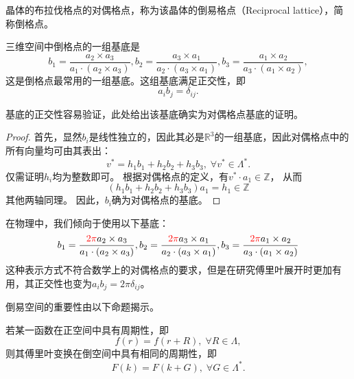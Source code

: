 \begin{definition}
    晶体的布拉伐格点的对偶格点，称为该晶体的倒易格点（Reciprocal lattice），简称倒格点。
\end{definition}

\begin{proposition}
    三维空间中倒格点的一组基底是
    \begin{equation}b_1 = \frac{a_2 \times a_3}{a_1 \cdot (a_2 \times a_3)}, b_2 = \frac{a_3 \times a_1}{a_2 \cdot (a_3 \times a_1)}, b_3 = \frac{a_1 \times a_2}{a_3 \cdot (a_1 \times a_2)},\end{equation}
    这是倒格点最常用的一组基底。这组基底满足正交性，即
    \begin{equation}a_i b_j = \delta_{ij}.\end{equation}
\end{proposition}

基底的正交性容易验证，此处给出该基底确实为对偶格点基底的证明。

\begin{proof}
    首先，显然$b_i$是线性独立的，因此其必是$\mathbb R^3$的一组基底，因此对偶格点中的所有向量均可由其表出：
    \begin{equation}v^* = h_1 b_1 + h_2 b_2 + h_3 b_3, \; \forall v^* \in \Lambda^*.\end{equation}
    仅需证明$h_i$均为整数即可。
    根据对偶格点的定义，有$v^* \cdot a_1\in \mathbb Z$，
    从而
    \begin{equation}(h_1 b_1 + h_2 b_2 + h_3 b_3) a_1 = h_1 \in \mathbb Z\end{equation}
    其他两轴同理。
    因此，$b_i$确为对偶格点的基底。
\end{proof}

在物理中，我们倾向于使用以下基底：
\begin{equation}
b_1 = \frac{\mathcolor{red}{2\pi} a_2 \times a_3}{a_1 \cdot (a_2 \times a_3)}, 
b_2 = \frac{\mathcolor{red}{2\pi} a_3 \times a_1}{a_2 \cdot (a_3 \times a_1)}, 
b_3 = \frac{\mathcolor{red}{2\pi} a_1 \times a_2}{a_3 \cdot (a_1 \times a_2)}
\end{equation}
这种表示方式不符合数学上的对偶格点的要求，但是在研究傅里叶展开时更加有用，其正交性也变为$a_i b_j = 2\pi \delta_{ij}$。

倒易空间的重要性由以下命题揭示。
\begin{proposition}
    \label{proposition:pontryagin-duality}
    若某一函数在正空间中具有周期性，即
    \begin{equation}f(r) = f(r + R), \; \forall R \in \Lambda,\end{equation}
    则其傅里叶变换在倒空间中具有相同的周期性，即
    \begin{equation}F(k) = F(k + G), \; \forall G \in \Lambda^*.\end{equation}
\end{proposition}

